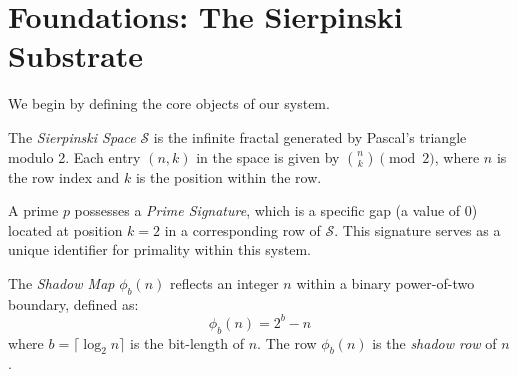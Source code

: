 \section{Foundations: The Sierpinski Substrate}

We begin by defining the core objects of our system.

\begin{definition}
The \textit{Sierpinski Space} $\mathcal{S}$ is the infinite fractal generated by Pascal's triangle modulo 2. Each entry $(n, k)$ in the space is given by $\binom{n}{k} \pmod{2}$, where $n$ is the row index and $k$ is the position within the row.
\end{definition}

\begin{definition}
A prime $p$ possesses a \textit{Prime Signature}, which is a specific gap (a value of 0) located at position $k=2$ in a corresponding row of $\mathcal{S}$. This signature serves as a unique identifier for primality within this system.
\end{definition}

\begin{definition}
The \textit{Shadow Map} $\phi_b(n)$ reflects an integer $n$ within a binary power-of-two boundary, defined as:
\[
\phi_b(n) = 2^b - n
\]
where $b = \lceil \log_2 n \rceil$ is the bit-length of $n$. The row $\phi_b(n)$ is the \textit{shadow row} of $n$.
\end{definition}

